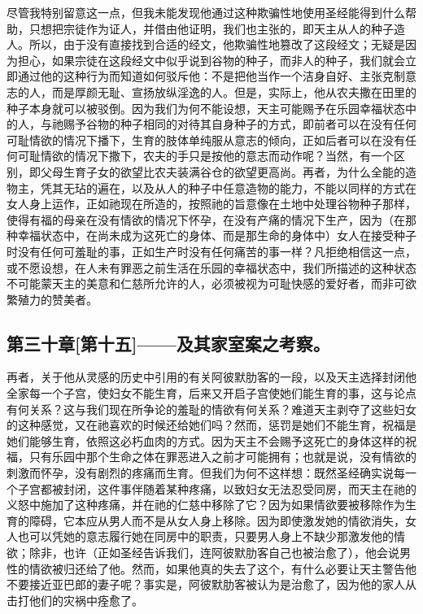 尽管我特别留意这一点，但我未能发现他通过这种欺骗性地使用圣经能得到什么帮助，只想把宗徒作为证人，并借由他证明，我们也主张的，即天主从人的种子造人。所以，由于没有直接找到合适的经文，他欺骗性地篡改了这段经文；无疑是因为担心，如果宗徒在这段经文中似乎说到谷物的种子，而非人的种子，我们就会立即通过他的这种行为而知道如何驳斥他：不是把他当作一个洁身自好、主张克制意志的人，而是厚颜无耻、宣扬放纵淫逸的人。但是，实际上，他从农夫撒在田里的种子本身就可以被驳倒。因为我们为何不能设想，天主可能赐予在乐园幸福状态中的人，与祂赐予谷物的种子相同的对待其自身种子的方式，即前者可以在没有任何可耻情欲的情况下播下，生育的肢体单纯服从意志的倾向，正如后者可以在没有任何可耻情欲的情况下撒下，农夫的手只是按他的意志而动作呢？当然，有一个区别，即父母生育子女的欲望比农夫装满谷仓的欲望更高尚。再者，为什么全能的造物主，凭其无玷的遍在，以及从人的种子中任意造物的能力，不能以同样的方式在女人身上运作，正如祂现在所造的，按照祂的旨意像在土地中处理谷物种子那样，使得有福的母亲在没有情欲的情况下怀孕，在没有产痛的情况下生产，因为（在那种幸福状态中，在尚未成为这死亡的身体、而是那生命的身体中）女人在接受种子时没有任何可羞耻的事，正如生产时没有任何痛苦的事一样？凡拒绝相信这一点，或不愿设想，在人未有罪恶之前生活在乐园的幸福状态中，我们所描述的这种状态不可能蒙天主的美意和仁慈所允许的人，必须被视为可耻快感的爱好者，而非可欲繁殖力的赞美者。\par


\subsection{第三十章[第十五]——及其家室案之考察。}

再者，关于他从灵感的历史中引用的有关阿彼默肋客的一段，以及天主选择封闭他全家每一个子宫，使妇女不能生育，后来又开启子宫使她们能生育的事，这与论点有何关系？这与我们现在所争论的羞耻的情欲有何关系？难道天主剥夺了这些妇女的这种感觉，又在祂喜欢的时候还给她们吗？然而，惩罚是她们不能生育，祝福是她们能够生育，依照这必朽血肉的方式。因为天主不会赐予这死亡的身体这样的祝福，只有乐园中那个生命之体在罪恶进入之前才可能拥有；也就是说，没有情欲的刺激而怀孕，没有剧烈的疼痛而生育。但我们为何不这样想：既然圣经确实说每一个子宫都被封闭，这件事伴随着某种疼痛，以致妇女无法忍受同房，而天主在祂的义怒中施加了这种疼痛，并在祂的仁慈中移除了它？因为如果情欲要被移除作为生育的障碍，它本应从男人而不是从女人身上移除。因为即使激发她的情欲消失，女人也可以凭她的意志履行她在同房中的职责，只要男人身上不缺少那激发他的情欲；除非，也许（正如圣经告诉我们，连阿彼默肋客自己也被治愈了），他会说男性的情欲被归还给了他。然而，如果他真的失去了这个，有什么必要让天主警告他不要接近亚巴郎的妻子呢？事实是，阿彼默肋客被认为是治愈了，因为他的家人从击打他们的灾祸中痊愈了。\par

